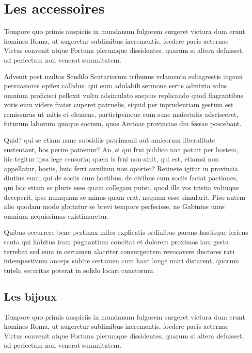 \documentclass{framatexclass}
\begin{document}
\section{Les accessoires}
Tempore quo primis auspiciis in mundanum fulgorem surgeret victura dum erunt homines Roma, ut augeretur sublimibus incrementis, foedere pacis aeternae Virtus convenit atque Fortuna plerumque dissidentes, quarum si altera defuisset, ad perfectam non venerat summitatem.

Advenit post multos Scudilo Scutariorum tribunus velamento subagrestis ingenii persuasionis opifex callidus. qui eum adulabili sermone seriis admixto solus omnium proficisci pellexit vultu adsimulato saepius replicando quod flagrantibus votis eum videre frater cuperet patruelis, siquid per inprudentiam gestum est remissurus ut mitis et clemens, participemque eum suae maiestatis adscisceret, futurum laborum quoque socium, quos Arctoae provinciae diu fessae poscebant.

Quid? qui se etiam nunc subsidiis patrimonii aut amicorum liberalitate sustentant, hos perire patiemur? An, si qui frui publico non potuit per hostem, hic tegitur ipsa lege censoria; quem is frui non sinit, qui est, etiamsi non appellatur, hostis, huic ferri auxilium non oportet? Retinete igitur in provincia diutius eum, qui de sociis cum hostibus, de civibus cum sociis faciat pactiones, qui hoc etiam se pluris esse quam collegam putet, quod ille vos tristia voltuque deceperit, ipse numquam se minus quam erat, nequam esse simularit. Piso autem alio quodam modo gloriatur se brevi tempore perfecisse, ne Gabinius unus omnium nequissimus existimaretur.

Quibus occurrere bene pertinax miles explicatis ordinibus parans hastisque feriens scuta qui habitus iram pugnantium concitat et dolorem proximos iam gestu terrebat sed eum in certamen alacriter consurgentem revocavere ductores rati intempestivum anceps subire certamen cum haut longe muri distarent, quorum tutela securitas poterat in solido locari cunctorum.

\subsection{Les bijoux}
Tempore quo primis auspiciis in mundanum fulgorem surgeret victura dum erunt homines Roma, ut augeretur sublimibus incrementis, foedere pacis aeternae Virtus convenit atque Fortuna plerumque dissidentes, quarum si altera defuisset, ad perfectam non venerat summitatem.
\end{document}
